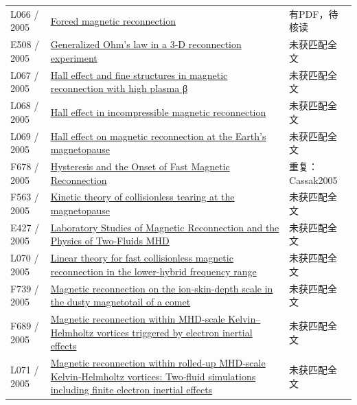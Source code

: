 \documentclass[UTF8,a4paper,11pt,openany,fontset=fandol]{ctexbook}
\begin{document}
\begin{longtable}{P{24mm}P{97mm}P{27mm}}
L066 / 2005 & \href{https://doi.org/10.1029/2004gl022058}{Forced magnetic reconnection} & 有PDF，待核读\\

E508 / 2005 & \href{https://doi.org/10.1029/2004gl021245}{Generalized Ohm's law in a 3‐D reconnection experiment} & 未获匹配全文\\

L067 / 2005 & \href{https://doi.org/10.1063/1.1870003}{Hall effect and fine structures in magnetic reconnection with high plasma β} & 未获匹配全文\\

L068 / 2005 & \href{https://doi.org/10.1029/2004ja010675}{Hall effect in incompressible magnetic reconnection} & 未获匹配全文\\

L069 / 2005 & \href{https://doi.org/10.1016/j.jastp.2005.03.013}{Hall effect on magnetic reconnection at the Earth's magnetopause} & 未获匹配全文\\

F678 / 2005 & \href{https://arxiv.org/pdf/physics/0502001}{Hysteresis and the Onset of Fast Magnetic Reconnection} & 重复：Cassak2005\\

F563 / 2005 & \href{https://doi.org/10.1029/2004ja010751}{Kinetic theory of collisionless tearing at the magnetopause} & 未获匹配全文\\

E427 / 2005 & \href{http://ui.adsabs.harvard.edu/abs/2005AGUFMSM11B..02Y/abstract}{Laboratory Studies of Magnetic Reconnection and the Physics of Two-Fluids MHD} & 未获匹配全文\\

L070 / 2005 & \href{https://doi.org/10.1063/1.1900094}{Linear theory for fast collisionless magnetic reconnection in the lower-hybrid frequency range} & 未获匹配全文\\

F739 / 2005 & \href{https://doi.org/10.1063/1.1883184}{Magnetic reconnection on the ion-skin-depth scale in the dusty magnetotail of a comet} & 未获匹配全文\\

F689 / 2005 & \href{https://doi.org/10.1016/j.asr.2005.01.057}{Magnetic reconnection within MHD-scale Kelvin–Helmholtz vortices triggered by electron inertial effects} & 未获匹配全文\\

L071 / 2005 & \href{https://doi.org/10.1029/2005gl023362}{Magnetic reconnection within rolled‐up MHD‐scale Kelvin‐Helmholtz vortices: Two‐fluid simulations including finite electron inertial effects} & 未获匹配全文\\


\end{longtable}
\end{document}
